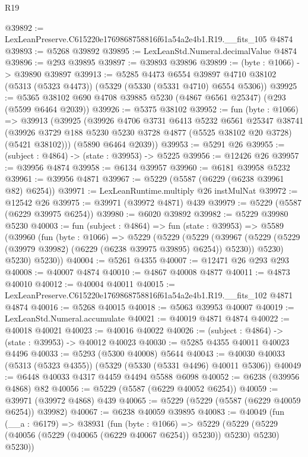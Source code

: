 \begin{lexlean}{R19}
\begin{coremodule}
@39892 := LexLeanPreserve.C615220e1769868758816f61a54a2e4b1.R19.__fits_105 @4874
@39893 := @5268 @39892
@39895 := LexLeanStd.Numeral.decimalValue @4874
@39896 := @293 @39895
@39897 := @39893 @39896
@39899 := (byte : @1066) -> @39890 @39897
@39913 := @5285
    @4473
    @6554
    @39897
    @4710
    @38102
    (@5313 (@5323 @4473))
    (@5329 (@5330 (@5331 @4710) @6554 @5306))
@39925 := @5365 @38102 @690 @4708 @39885 @5230 (@4867 @6561 @25347) (@293 (@5599 @6464 @2039))
@39926 := @5375 @38102
@39952 := fun (byte : @1066) =>
  @39913
    (@39925
      (@39926
        @4706
        @3731
        @6413
        @5232
        @6561
        @25347
        @38741
        (@39926 @3729 @188 @5230 @5230 @3728 @4877 (@5525 @38102 @20 @3728) (@5421 @38102)))
      (@5890 @6464 @2039))
@39953 := @5291 @26
@39955 := (subject : @4864) -> (state : @39953) -> @5225
@39956 := @12426 @26
@39957 := @39956 @4874
@39958 := @6134 @39957
@39960 := @6181 @39958 @5232
@39961 := @39956 @4871
@39967 := @5229 (@5587 (@6229 (@6238 @39961 @82) @6254))
@39971 := LexLeanRuntime.multiply @26 instMulNat
@39972 := @12542 @26
@39975 := @39971 (@39972 @4871) @439
@39979 := @5229 (@5587 (@6229 @39975 @6254))
@39980 := @6020 @39892
@39982 := @5229 @39980 @5230
@40003 := fun (subject : @4864) =>
  fun (state : @39953) =>
  @5589
    (@39960
      (fun (byte : @1066) =>
      @5229
        (@5229
          (@5229
            (@39967 (@5229 (@5229 (@39979 @39982) (@6229 (@6238 @39975 @39895) @6254)) @5230))
            @5230)
          @5230)
        @5230))
@40004 := @5261 @4355
@40007 := @12471 @26 @293 @293
@40008 := @40007 @4874
@40010 := @4867 @40008 @4877
@40011 := @4873 @40010
@40012 := @40004 @40011
@40015 := LexLeanPreserve.C615220e1769868758816f61a54a2e4b1.R19.__fits_102 @4871 @4874
@40016 := @5268 @40015
@40018 := @5063 @39953 @40007
@40019 := LexLeanStd.Numeral.accumulate
@40021 := @40019 @4871 @4874
@40022 := @40018 @40021
@40023 := @40016 @40022
@40026 := (subject : @4864) -> (state : @39953) -> @40012 @40023
@40030 := @5285 @4355 @40011 @40023 @4496
@40033 := @5293 (@5300 @40008) @5644
@40043 := @40030 @40033 (@5313 (@5323 @4355)) (@5329 (@5330 (@5331 @4496) @40011 @5306))
@40049 := @6448 @40033 @4317 @4459 @4494 @5588 @6098
@40052 := @6238 (@39956 @4868) @82
@40056 := @5229 (@5587 (@6229 @40052 @6254))
@40059 := @39971 (@39972 @4868) @439
@40065 := @5229 (@5229 (@5587 (@6229 @40059 @6254)) @39982)
@40067 := @6238 @40059 @39895
@40083 := @40049
    (fun (__a : @6179) =>
    @38931
      (fun (byte : @1066) =>
      @5229 (@5229 (@5229 (@40056 (@5229 (@40065 (@6229 @40067 @6254)) @5230)) @5230) @5230) @5230))

\end{coremodule}
\end{lexlean}
